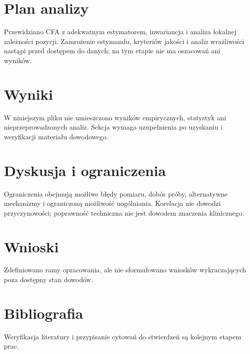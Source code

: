 \documentclass[11pt,a4paper]{article}
\begin{document}
\section{Plan analizy}

Przewidziano CFA z adekwatnym estymatorem, inwariancja i analiza lokalnej zależności pozycji. Zamrożenie estymandu, kryteriów jakości i analiz wrażliwości nastąpi przed dostępem do danych; na tym etapie nie ma oszacowań ani wyników.

\section{Wyniki}

W niniejszym pliku nie umieszczono wyników empirycznych, statystyk ani nieprzeprowadzonych analiz. Sekcja wymaga uzupełnienia po uzyskaniu i weryfikacji materiału dowodowego.

\section{Dyskusja i ograniczenia}

Ograniczenia obejmują możliwe błędy pomiaru, dobór próby, alternatywne mechanizmy i ograniczoną możliwość uogólniania. Korelacja nie dowodzi przyczynowości; poprawność techniczna nie jest dowodem znaczenia klinicznego.

\section{Wnioski}

Zdefiniowano ramy opracowania, ale nie sformułowano wniosków wykraczających poza dostępny stan dowodów.

\section*{Bibliografia}

Weryfikacja literatury i przypisanie cytowań do stwierdzeń są kolejnym etapem prac.
\end{document}

